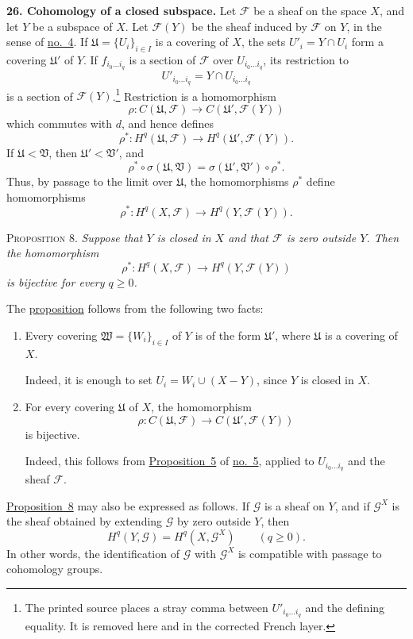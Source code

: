 
\medskip
{}\label{fac:I:3:no:26}
\textbf{26. Cohomology of a closed subspace.}
Let $\mathcal{F}$ be a sheaf on the space $X$, and let $Y$ be a subspace of $X$. Let $\mathcal{F}(Y)$ be the sheaf induced by $\mathcal{F}$ on $Y$, in the sense of \hyperref[fac:I:1:no:4]{no.~4}. If
$\mathfrak{U}=\{U_i\}_{i\in I}$ is a covering of $X$, the sets
$U'_i=Y\cap U_i$ form a covering $\mathfrak{U}'$ of $Y$. If
$f_{i_0\ldots i_q}$ is a section of $\mathcal{F}$ over $U_{i_0\ldots i_q}$, its restriction to
\[
U'_{i_0\ldots i_q}=Y\cap U_{i_0\ldots i_q}
\]
is a section of $\mathcal{F}(Y)$.\footnote{The printed source places a stray comma between $U'_{i_0\ldots i_q}$ and the defining equality. It is removed here and in the corrected French layer.}
Restriction is a homomorphism
\[
\rho:C(\mathfrak{U},\mathcal{F})
\longrightarrow C(\mathfrak{U}',\mathcal{F}(Y))
\]
which commutes with $d$, and hence defines
\[
\rho^*:H^q(\mathfrak{U},\mathcal{F})
\longrightarrow H^q(\mathfrak{U}',\mathcal{F}(Y)).
\]
If $\mathfrak{U}<\mathfrak{V}$, then $\mathfrak{U}'<\mathfrak{V}'$, and
\[
\rho^*\circ\sigma(\mathfrak{U},\mathfrak{V})
=\sigma(\mathfrak{U}',\mathfrak{V}')\circ\rho^*.
\]
Thus, by passage to the limit over $\mathfrak{U}$, the homomorphisms $\rho^*$ define homomorphisms
\[
\rho^*:H^q(X,\mathcal{F})
\longrightarrow H^q(Y,\mathcal{F}(Y)).
\]

\label{fac:I:3:no:26:prop:8}
\textsc{Proposition 8.} \textit{Suppose that $Y$ is closed in $X$ and that $\mathcal{F}$ is zero outside $Y$. Then the homomorphism}
\[
\rho^*:H^q(X,\mathcal{F})\longrightarrow H^q(Y,\mathcal{F}(Y))
\]
\textit{is bijective for every $q\geq0$.}

The \hyperref[fac:I:3:no:26:prop:8]{proposition} follows from the following two facts:

\begin{enumerate}[label=(\alph*),leftmargin=2.5em]
\item Every covering $\mathfrak{W}=\{W_i\}_{i\in I}$ of $Y$ is of the form $\mathfrak{U}'$, where $\mathfrak{U}$ is a covering of $X$.

Indeed, it is enough to set $U_i=W_i\cup(X-Y)$, since $Y$ is closed in $X$.

\item For every covering $\mathfrak{U}$ of $X$, the homomorphism
\[
\rho:C(\mathfrak{U},\mathcal{F})
\longrightarrow C(\mathfrak{U}',\mathcal{F}(Y))
\]
is bijective.

Indeed, this follows from \hyperref[fac:I:1:no:5:prop:5]{Proposition~5} of \hyperref[fac:I:1:no:5]{no.~5}, applied to $U_{i_0\ldots i_q}$ and the sheaf $\mathcal{F}$.
\end{enumerate}

\hyperref[fac:I:3:no:26:prop:8]{Proposition~8} may also be expressed as follows. If $\mathcal{G}$ is a sheaf on $Y$, and if $\mathcal{G}^X$ is the sheaf obtained by extending $\mathcal{G}$ by zero outside $Y$, then
\[
H^q(Y,\mathcal{G})=H^q(X,\mathcal{G}^X)
\qquad(q\geq0).
\]
In other words, the identification of $\mathcal{G}$ with $\mathcal{G}^X$ is compatible with passage to cohomology groups.
